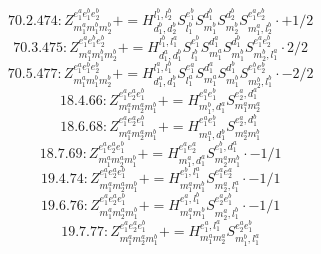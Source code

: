 \documentclass[letterpaper,10pt,fleqn,leqno,onecolumn]{article}
\begin{document}
\begin{equation} \;\;\;\;\;\;  70.2.474: Z^{e_{1}^{a}e_{1}^{b}e_{2}^{b}}_{m_{1}^{a}m_{1}^{b}m_{2}^{b}}+=H^{l_{1}^{b},l_{2}^{b}}_{d_{1}^{b},d_{2}^{b}}S^{e_{1}^{b}}_{l_{1}^{b}}S^{d_{1}^{b}}_{m_{1}^{b}}S^{d_{2}^{b}}_{m_{2}^{b}}S^{e_{1}^{a}e_{2}^{b}}_{m_{1}^{a},l_{2}^{b}}\cdot +1/2 \end{equation}
\begin{equation} \;\;\;\;\;\;  70.3.475: Z^{e_{1}^{a}e_{1}^{b}e_{2}^{b}}_{m_{1}^{a}m_{1}^{b}m_{2}^{b}}+=H^{l_{1}^{b},l_{1}^{a}}_{d_{1}^{a},d_{1}^{b}}S^{e_{1}^{b}}_{l_{1}^{b}}S^{d_{1}^{a}}_{m_{1}^{a}}S^{d_{1}^{b}}_{m_{1}^{b}}S^{e_{1}^{a}e_{2}^{b}}_{m_{2}^{b},l_{1}^{a}}\cdot 2/2 \end{equation}
\begin{equation} \;\;\;\;\;\;  70.5.477: Z^{e_{1}^{a}e_{1}^{b}e_{2}^{b}}_{m_{1}^{a}m_{1}^{b}m_{2}^{b}}+=H^{l_{1}^{a},l_{1}^{b}}_{d_{1}^{a},d_{1}^{b}}S^{e_{1}^{a}}_{l_{1}^{a}}S^{d_{1}^{a}}_{m_{1}^{a}}S^{d_{1}^{b}}_{m_{1}^{b}}S^{e_{1}^{b}e_{2}^{b}}_{m_{2}^{b},l_{1}^{b}}\cdot -2/2 \end{equation}
\begin{equation} \;\;\;\;\;\;  18.4.66: Z^{e_{1}^{a}e_{2}^{a}e_{1}^{b}}_{m_{1}^{a}m_{2}^{a}m_{1}^{b}}+=H^{e_{1}^{a}e_{1}^{b}}_{m_{1}^{b},d_{1}^{a}}S^{e_{2}^{a},d_{1}^{a}}_{m_{1}^{a}m_{2}^{a}} \end{equation}
\begin{equation} \;\;\;\;\;\;  18.6.68: Z^{e_{1}^{a}e_{2}^{a}e_{1}^{b}}_{m_{1}^{a}m_{2}^{a}m_{1}^{b}}+=H^{e_{1}^{a}e_{1}^{b}}_{m_{1}^{a},d_{1}^{b}}S^{e_{2}^{a},d_{1}^{b}}_{m_{2}^{a}m_{1}^{b}} \end{equation}
\begin{equation} \;\;\;\;\;\;  18.7.69: Z^{e_{1}^{a}e_{2}^{a}e_{1}^{b}}_{m_{1}^{a}m_{2}^{a}m_{1}^{b}}+=H^{e_{1}^{a}e_{2}^{a}}_{m_{1}^{a},d_{1}^{a}}S^{e_{1}^{b},d_{1}^{a}}_{m_{2}^{a}m_{1}^{b}}\cdot -1/1 \end{equation}
\begin{equation} \;\;\;\;\;\;  19.4.74: Z^{e_{1}^{a}e_{2}^{a}e_{1}^{b}}_{m_{1}^{a}m_{2}^{a}m_{1}^{b}}+=H^{e_{1}^{b},l_{1}^{a}}_{m_{1}^{a}m_{1}^{b}}S^{e_{1}^{a}e_{2}^{a}}_{m_{2}^{a},l_{1}^{a}}\cdot -1/1 \end{equation}
\begin{equation} \;\;\;\;\;\;  19.6.76: Z^{e_{1}^{a}e_{2}^{a}e_{1}^{b}}_{m_{1}^{a}m_{2}^{a}m_{1}^{b}}+=H^{e_{1}^{a},l_{1}^{b}}_{m_{1}^{a}m_{1}^{b}}S^{e_{2}^{a}e_{1}^{b}}_{m_{2}^{a},l_{1}^{b}}\cdot -1/1 \end{equation}
\begin{equation} \;\;\;\;\;\;  19.7.77: Z^{e_{1}^{a}e_{2}^{a}e_{1}^{b}}_{m_{1}^{a}m_{2}^{a}m_{1}^{b}}+=H^{e_{1}^{a},l_{1}^{a}}_{m_{1}^{a}m_{2}^{a}}S^{e_{2}^{a}e_{1}^{b}}_{m_{1}^{b},l_{1}^{a}} \end{equation}
\end{document}

